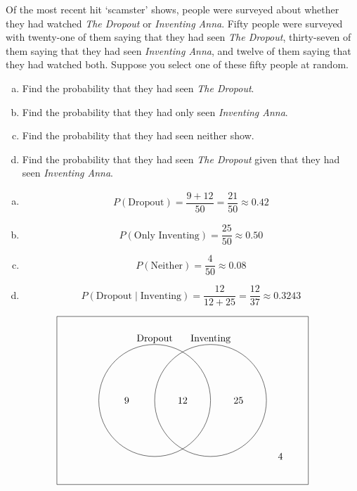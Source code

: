 \documentclass[11pt,letterpaper]{article}
\begin{document}
\newpage



 Of the most recent hit `scamster' shows, people were surveyed about whether they had watched \textit{The Dropout} or \textit{Inventing Anna}. Fifty people were surveyed with twenty-one of them saying that they had seen \textit{The Dropout}, thirty-seven of them saying that they had seen \textit{Inventing Anna}, and twelve of them saying that they had watched both. Suppose you select one of these fifty people at random. 
	\begin{enumerate}[(a)]
	\item Find the probability that they had seen \textit{The Dropout}.
	\item Find the probability that they had only seen \textit{Inventing Anna}.
	\item Find the probability that they had seen neither show.
	\item Find the probability that they had seen \textit{The Dropout} given that they had seen \textit{Inventing Anna}.
	\end{enumerate} \pspace

\sol
\begin{enumerate}[(a)]
\item 
	\[
	\begin{aligned}
	P(\text{Dropout})= \dfrac{9 + 12}{50}= \dfrac{21}{50} \approx 0.42
	\end{aligned}
	\]

\item 
	\[
	P(\text{Only Inventing})= \dfrac{25}{50} \approx 0.50
	\]

\item 
	\[
	P(\text{Neither})= \dfrac{4}{50} \approx 0.08
	\]

\item 
	\[
	P(\text{Dropout} \;|\; \text{Inventing})= \dfrac{12}{12 + 25}= \dfrac{12}{37} \approx 0.3243
	\]
\end{enumerate} \pspace

	\[
	\begin{tikzpicture}
	\draw (0,0) rectangle (9,6);
	\draw (3.5,3) circle (2);
	\draw (5.5,3) circle (2);
	
	\node at (3.5,5.2) {Dropout};
	\node at (5.5,5.2) {Inventing}; 
	
	\node at (2.5,3) {9};
	\node at (4.5,3) {12};
	\node at (6.5,3) {25};
	\node at (8,1) {4};
	\end{tikzpicture}
	\]
\end{document}
